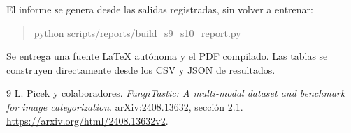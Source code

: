 \documentclass[11pt,a4paper]{article}
\begin{document}
El informe se genera desde las salidas registradas, sin volver a entrenar:
\begin{quote}\small\ttfamily
python scripts/reports/build\_s9\_s10\_report.py
\end{quote}
Se entrega una fuente LaTeX autónoma y el PDF compilado. Las tablas se
construyen directamente desde los CSV y JSON de resultados.

\begin{thebibliography}{9}
L. Picek y colaboradores.
\emph{FungiTastic: A multi-modal dataset and benchmark for image categorization}.
arXiv:2408.13632, sección 2.1.
\url{https://arxiv.org/html/2408.13632v2}.
\end{thebibliography}
\end{document}
